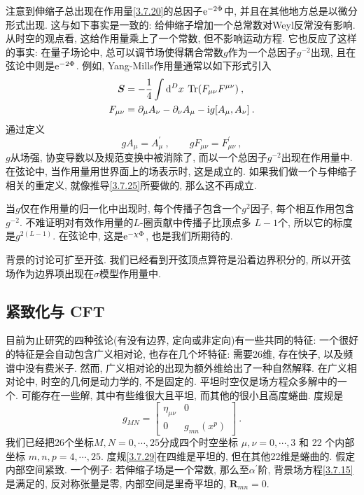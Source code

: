 注意到伸缩子总出现在作用量\eqref{3.7.20}的总因子$\mathrm{e}^{-2 \Phi}$中, 并且在其他地方总是以微分形式出现. 这与如下事实是一致的: 给伸缩子增加一个总常数对Weyl反常没有影响. 从时空的观点看, 这给作用量乘上了一个常数, 但不影响运动方程. 它也反应了这样的事实: 在量子场论中, 总可以调节场使得耦合常数$g$作为一个总因子$g^{-2}$出现, 
且在弦论中则是$\mathrm{e}^{-2 \Phi}$. 例如, Yang-Mills作用量通常以如下形式引入
\begin{subequations} \label{3.7.27}
\begin{align}
\bm{S} &=-\frac{1}{4} \int \mathrm{d}^{D} x \: \operatorname{Tr}(F_{\mu \nu} F^{\mu \nu}) \:, \label{3.7.27a} \\
F_{\mu \nu}&=\partial_{\mu} A_{\nu}-\partial_{\nu} A_{\mu}-\mathrm{i} g[A_{\mu}, A_{\nu}] \:. \label{3.7.27b}
\end{align}
\end{subequations}
通过定义
\begin{equation}
g A_{\mu}=A_{\mu}^{\prime}\:, \qquad g F_{\mu\nu}=F_{\mu\nu}^{\prime} \:, \label{3.7.28}
\end{equation}
$g$从场强, 协变导数以及规范变换中被消除了, 而以一个总因子$g^{-2}$出现在作用量中. 在弦论中, 当作用量用世界面上的场表示时, 这是成立的. 
如果我们做一个与伸缩子相关的重定义, 就像推导\eqref{3.7.25}所要做的, 那么这不再成立.

当$g$仅在作用量的归一化中出现时, 每个传播子包含一个$g^{2}$因子, 每个相互作用包含$g^{-2}$. 不难证明对有效作用量的$L$-圈贡献中传播子比顶点多 $L{-}1$个, 
所以它的标度是$g^{2(L-1)}$. 在弦论中, 这是$\mathrm{e}^{-\chi \Phi}$, 也是我们所期待的.

背景的讨论可扩至开弦. 我们已经看到开弦顶点算符是沿着边界积分的, 所以开弦场作为边界项出现在$\sigma$模型作用量中.


\subsection*{紧致化与 CFT}
目前为止研究的四种弦论(有没有边界, 定向或非定向)有一些共同的特征: 一个很好的特征是会自动包含广义相对论, 也存在几个坏特征: 需要26维, 存在快子, 以及频谱中没有费米子. 然而, 广义相对论的出现为额外维给出了一种自然解释. 在广义相对论中, 时空的几何是动力学的, 不是固定的. 平坦时空仅是场方程众多解中的一个. 可能存在一些解, 其中有些维很大且平坦, 而其他的很小且高度蜷曲. 度规是
\begin{equation}\label{3.7.29}
g_{M N}=\begin{bmatrix}
\eta_{\mu \nu} & 0 \\
0 & g_{m n}(x^{p})
\end{bmatrix} \:.
\end{equation}
我们已经把26个坐标$M,N=0,\cdots,25$分成四个时空坐标 $\mu, \nu=0, \cdots, 3$ 和 22 个内部坐标 $m, n, p=4, \cdots, 25$. 
度规\eqref{3.7.29}在四维是平坦的, 但在其他22维是蜷曲的. 假定内部空间紧致. 一个例子: 若伸缩子场是一个常数, 那么至$\alpha^{\prime}$阶, 背景场方程\eqref{3.7.15}是满足的, 
反对称张量是零, 内部空间是里奇平坦的, $\bm{R}_{m n}=0$.


